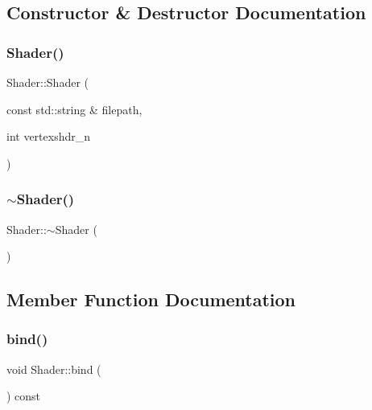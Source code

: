 \subsection{Constructor \& Destructor Documentation}
\mbox{\label{class_shader_a493fba969a782cf9e15e2c88933f653a}} 
\subsubsection{\texorpdfstring{Shader()}{Shader()}}
{\footnotesize\ttfamily Shader\+::\+Shader (\begin{DoxyParamCaption}\item[{const std\+::string \&}]{filepath,  }\item[{int}]{vertexshdr\+\_\+n }\end{DoxyParamCaption})}

\mbox{\label{class_shader_aff01df87e8a102f270b5b135a295e59d}} 
\subsubsection{\texorpdfstring{$\sim$\+Shader()}{~Shader()}}
{\footnotesize\ttfamily Shader\+::$\sim$\+Shader (\begin{DoxyParamCaption}{ }\end{DoxyParamCaption})}



\subsection{Member Function Documentation}
\mbox{\label{class_shader_aadbc0ca0d899238d547f87f19461dfeb}} 
\subsubsection{\texorpdfstring{bind()}{bind()}}
{\footnotesize\ttfamily void Shader\+::bind (\begin{DoxyParamCaption}{ }\end{DoxyParamCaption}) const}


